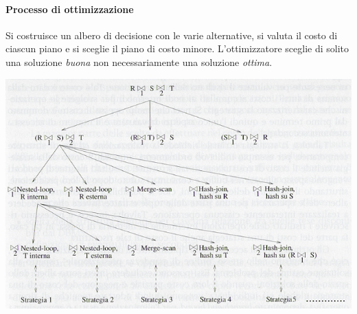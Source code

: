 \paragraph{Processo di ottimizzazione}
Si costruisce un albero di decisione con le varie alternative, si valuta il costo di ciascun piano e si sceglie il piano di costo minore. L'ottimizzatore sceglie di solito una soluzione \emph{buona} non necessariamente una soluzione \emph{ottima}.
\begin{center}\includegraphics{images/232.PNG}\end{center}

